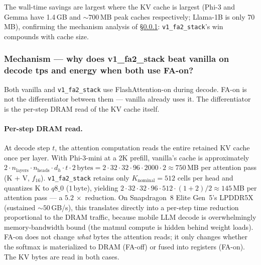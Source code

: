 \documentclass[sigconf, anonymous=false, screen=true]{acmart}
\begin{document}
The wall-time savings are largest where the KV cache is largest (Phi-3 and Gemma have 1.4\,GB and $\sim 700$\,MB peak caches respectively; Llama-1B is only 70\,MB), confirming the mechanism analysis of \S\ref{sec:mechanism}: \texttt{v1\_fa2\_stack}'s win compounds with cache size.

\subsubsection{Mechanism --- why does v1\_fa2\_stack beat vanilla on decode tps and energy when both use FA-on?}
\label{sec:mechanism}

Both vanilla and \texttt{v1\_fa2\_stack} use FlashAttention-on during decode. FA-on is not the differentiator between them --- vanilla already uses it. The differentiator is the per-step DRAM read of the KV cache itself.

\paragraph{Per-step DRAM read.} At decode step $t$, the attention computation reads the entire retained KV cache once per layer. With Phi-3-mini at a 2K prefill, vanilla's cache is approximately $2 \cdot n_{\text{layers}} \cdot n_{\text{heads}} \cdot d_h \cdot t \cdot 2\,\text{bytes} = 2 \cdot 32 \cdot 32 \cdot 96 \cdot 2000 \cdot 2 \approx 750$\,MB per attention pass (K + V, $f_{16}$). \texttt{v1\_fa2\_stack} retains only $K_{\text{nominal}}{=}512$ cells per head and quantizes K to $q8\_0$ ($1\,\text{byte}$), yielding $2 \cdot 32 \cdot 32 \cdot 96 \cdot 512 \cdot (1{+}2)/2 \approx 145$\,MB per attention pass --- a $5.2\,\times$ reduction. On Snapdragon~8 Elite Gen~5's LPDDR5X (sustained $\sim 50$\,GB/s), this translates directly into a per-step time reduction proportional to the DRAM traffic, because mobile LLM decode is overwhelmingly memory-bandwidth bound (the matmul compute is hidden behind weight loads). FA-on does not change \emph{what} bytes the attention reads; it only changes whether the softmax is materialized to DRAM (FA-off) or fused into registers (FA-on). The KV bytes are read in both cases.
\end{document}
